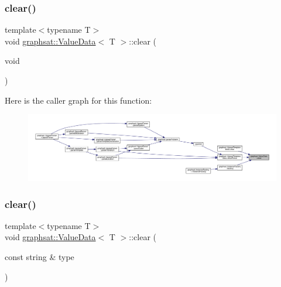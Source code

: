 \subsubsection{\texorpdfstring{clear()}{clear()}\hspace{0.1cm}{\footnotesize\ttfamily [1/2]}}
{\footnotesize\ttfamily template$<$typename T$>$ \\
void \mbox{\hyperlink{classgraphsat_1_1_value_data}{graphsat\+::\+Value\+Data}}$<$ T $>$\+::clear (\begin{DoxyParamCaption}\item[{void}]{ }\end{DoxyParamCaption})\hspace{0.3cm}{\ttfamily [inline]}}

Here is the caller graph for this function\+:
\nopagebreak
\begin{figure}[H]
\begin{center}
\leavevmode
\includegraphics[width=350pt]{classgraphsat_1_1_value_data_a01ec9ee50f85bff7eaa5a29e2b5c7d53_icgraph}
\end{center}
\end{figure}
\mbox{\label{classgraphsat_1_1_value_data_a6601a601e64ad58e8d584226a13771e7}} 
\subsubsection{\texorpdfstring{clear()}{clear()}\hspace{0.1cm}{\footnotesize\ttfamily [2/2]}}
{\footnotesize\ttfamily template$<$typename T$>$ \\
void \mbox{\hyperlink{classgraphsat_1_1_value_data}{graphsat\+::\+Value\+Data}}$<$ T $>$\+::clear (\begin{DoxyParamCaption}\item[{const string \&}]{type }\end{DoxyParamCaption})\hspace{0.3cm}{\ttfamily [inline]}}

